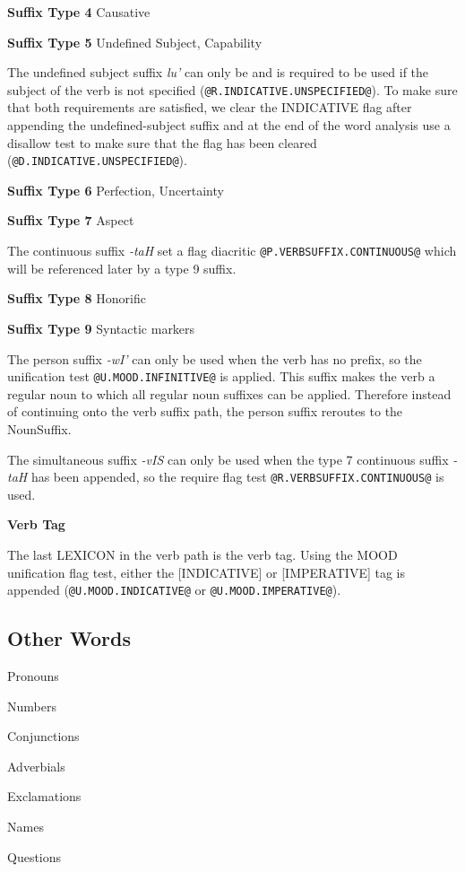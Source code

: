 \documentclass[11pt]{article}
\begin{document}
\textbf{Suffix Type 4} Causative

\textbf{Suffix Type 5} Undefined Subject, Capability

The undefined subject suffix \textit{lu'} can only be and is required to be used if the subject of the verb is not specified (\texttt{@R.INDICATIVE.UNSPECIFIED@}). To make sure that both requirements are satisfied, we clear the INDICATIVE flag after appending the undefined-subject suffix and at the end of the word analysis use a disallow test to make sure that the flag has been cleared (\texttt{@D.INDICATIVE.UNSPECIFIED@}).

\textbf{Suffix Type 6} Perfection, Uncertainty

\textbf{Suffix Type 7} Aspect

The continuous suffix \textit{-taH} set a flag diacritic \texttt{@P.VERBSUFFIX.CONTINUOUS@} which will be referenced later by a type 9 suffix.

\textbf{Suffix Type 8} Honorific

\textbf{Suffix Type 9} Syntactic markers

The person suffix \textit{-wI'} can only be used when the verb has no prefix, so the unification test \texttt{@U.MOOD.INFINITIVE@} is applied. This suffix makes the verb a regular noun to which all regular noun suffixes can be applied. Therefore instead of continuing onto the verb suffix path, the person suffix reroutes to the NounSuffix.

The simultaneous suffix \textit{-vIS} can only be used when the type 7 continuous suffix \textit{-taH} has been appended, so the require flag test \texttt{@R.VERBSUFFIX.CONTINUOUS@} is used.

\textbf{Verb Tag}

The last LEXICON in the verb path is the verb tag. Using the MOOD unification flag test, either the [INDICATIVE] or [IMPERATIVE] tag is appended (\texttt{@U.MOOD.INDICATIVE@} or \texttt{@U.MOOD.IMPERATIVE@}).

\subsection {Other Words}

Pronouns

Numbers

Conjunctions

Adverbials

Exclamations

Names

Questions
\end{document}
